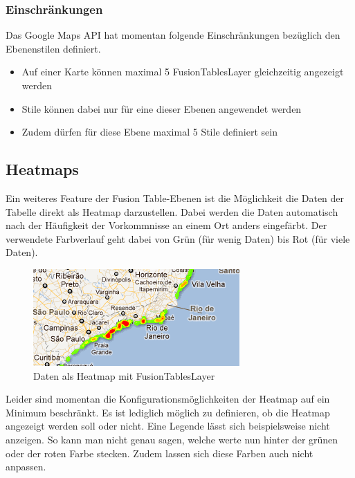 \subsubsection{Einschränkungen}
\label{fusiontableslayer-styles-restrictions}
Das Google Maps API hat momentan folgende Einschränkungen bezüglich den Ebenenstilen definiert.

\begin{itemize}
\item Auf einer Karte können maximal 5 FusionTablesLayer gleichzeitig angezeigt werden
\item Stile können dabei nur für eine dieser Ebenen angewendet werden
\item Zudem dürfen für diese Ebene maximal 5 Stile definiert sein
\end{itemize}

\subsection{Heatmaps}
Ein weiteres Feature der Fusion Table-Ebenen ist die Möglichkeit die Daten der Tabelle direkt als Heatmap darzustellen. Dabei werden die Daten automatisch nach der Häufigkeit der Vorkommnisse an einem Ort anders eingefärbt. Der verwendete Farbverlauf geht dabei von Grün (für wenig Daten) bis Rot (für viele Daten).

\begin{figure}[!h]
	\centering
	\includegraphics{images/gmap_fusiontableslayer_heatmap.png}
	\caption{Daten als Heatmap mit FusionTablesLayer}
	\label{fusiontableslayer-heatmap}
\end{figure}

Leider sind momentan die Konfigurationsmöglichkeiten der Heatmap auf ein Minimum beschränkt. Es ist lediglich möglich zu definieren, ob die Heatmap angezeigt werden soll oder nicht. Eine Legende lässt sich beispielsweise nicht anzeigen. So kann man nicht genau sagen, welche werte nun hinter der grünen oder der roten Farbe stecken. Zudem lassen sich diese Farben auch nicht anpassen.

